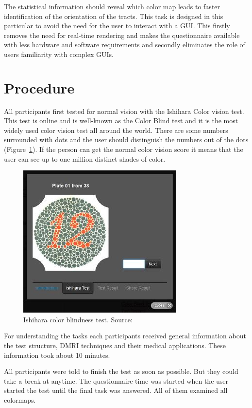 \documentclass[hyperref, plainreport, noproblem]{cgvpub1}
\begin{document}
The statistical information should reveal which color map leads to faster identification of the orientation of the tracts. This task is designed in this particular to avoid the need for the user to interact with a GUI. This firstly removes the need for real-time rendering and makes the questionnaire available with less hardware and software requirements and secondly eliminates the role of users familiarity with complex GUIs.

\clearpage


\section{Procedure}
\label{procedure}
All participants first tested for normal vision with the Ishihara Color vision test. This test is online and is well-known as the Color Blind test and it is the most widely used color vision test all around the world. There are some numbers surrounded with dots and the user should distinguish the numbers out of the dots (Figure~\ref{fig:Ishihara}). If the person can get the normal color vision score it means that the user can see up to one million distinct shades of color.
\begin{figure}[ht]
    \centering
    \includegraphics[width = 0.6\columnwidth]{Ishihara}
    \caption{Ishihara color blindness test. Source:  \cite{www.color-blindness.com}}
    \label{fig:Ishihara}
\end{figure}

For understanding the tasks each participants received general information about the test structure, DMRI techniques and their medical applications. These information took about 10 minutes. 

All participants were told to finish the test as soon as possible. But they could take a break at anytime. The questionnaire time was started when the user started the test until the final task was answered. 
All of them examined all colormaps.
\end{document}
